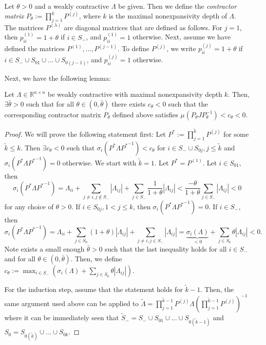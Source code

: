 \documentclass[onefignum,onetabnum]{siamonline220329}
\def\infty{}%
\begin{document}
{Let $\theta>0$ and a weakly contractive $\Lambda$ be given. Then we define the \emph{contractor matrix} $P_\theta:=\prod_{{j}=1}^k P^{(j)}$, where $k$ is the maximal nonexpansivity depth of $\Lambda$. The matrices  $P^{({\lambda})}$ are diagonal matrices that are defined as follows. For ${j}=1$, then $p_{ii}^{(1)}=1+\theta$ if $i\in S_{-}$, and $p_{ii}^{(1)}=1$ otherwise.  Next, assume we have defined the matrices $P^{(1)},\dots,P^{(j-1)}$. To define $P^{(j)}$, we write $p_{ii}^{(j)}=1+\theta$ if $i\in S_{-} \cup S_{01} \cup \dots \cup S_{0(j-1)}$, and $p_{ii}^{(j)}=1$ otherwise.

Next, we have the following lemma:
\begin{lemma}\label{lem.contractor}
	Let $\Lambda \in \mathbb R^{n \times n}$ be weakly contractive with maximal nonexpansivity depth $k$. Then, $\exists \bar\theta>0$ such that  for all $ \theta \in (0,\bar\theta)$ there exists $c_\theta<0$ such that the corresponding  contractor matrix $P_\theta$ defined above satisfies $\mu_{\infty}(P_\theta JP_\theta^{-1})<c_\theta <0$.
	\end{lemma}
	\begin{proof} We will prove the following statement first: Let $P^*:=\prod_{j=1}^{\tilde k} P^{(j)}$ for some $\tilde k\le k$. Then $\exists c_\theta<0$ such that $\sigma_i(P^* \Lambda {P^*}^{-1})<c_\theta$ for $i \in S_- \cup S_{0j}, j \le \tilde k$ and $\sigma_i(P^* \Lambda {P^*}^{-1})=0$ otherwise. We start with $\tilde k=1$. Let $ P^*=P^{(1)}$.  Let $i \in S_{01}$, then  
		\[\sigma_i(P^* \Lambda {P^*}^{-1})= \Lambda_{ii}+ \sum_{j\ne i, j \not\in S_- } |\Lambda_{ij} |+ \sum_{j\in S_- } \frac 1{1+\theta }|\Lambda_{ij} |< \frac{-\theta}{1+\theta}  \sum_{j\in S_- } |\Lambda_{ij} | <0 \]
		for any choice {of} $\theta>0$. 
		 If $i\in S_{0j}, 1<j\le k$, then $\sigma_i(P^* \Lambda {P^*}^{-1})=0$.	If $i \in S_{-}$, then 
				\[\sigma_i(P^* \Lambda {P^*}^{-1})= \Lambda_{ii}+ \sum_{ j \in S_{0} } (1+\theta)   |\Lambda_{ij} |+ \sum_{j\ne i, j\in S_- } |\Lambda_{ij} |=  \underbrace{\sigma_i(\Lambda)}_{<0}+ \sum_{ j \in S_{0} } \theta   |\Lambda_{ij} | <0.\]
				Note exists a small enough $\bar\theta>0$ such that the last inequality holds  for all $i\in S_-$ and for all $\theta \in (0,\bar\theta)$. 
				Then, we define  $ c_\theta:= \max _{i \in S_-} \left (\sigma_i(\Lambda) + \sum_{ j \in S_{0} } \theta   |\Lambda_{ij} |\right)$.
				
			 For the induction step, assume that the statement holds for $\tilde k-1$. Then, the same argument used above can be applied to $\tilde \Lambda=\prod_{j=1}^{\tilde k-1} P^{(j)}  \Lambda \left (\prod_{j=1}^{\tilde k-1} P^{(j)}\right )^{-1} $ where it can be immediately seen that $\tilde S_-=S_- \cup S_{01} \cup \dots \cup S_{0(\tilde k-1)}$ and $S_0= S_{0(\tilde k)} \cup \dots \cup S_{0k}$.
		\end{proof}
	
}
\end{document}

